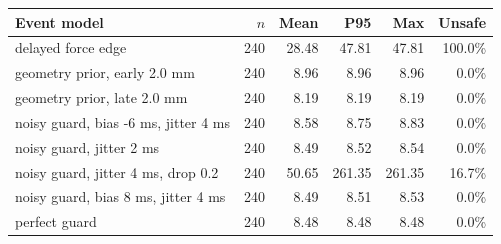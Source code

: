 \begin{tabular}{lrrrrr}\toprule
Event model & $n$ & Mean & P95 & Max & Unsafe\\
\midrule
delayed force edge & 240 & 28.48 & 47.81 & 47.81 & 100.0\%\\
geometry prior, early 2.0 mm & 240 & 8.96 & 8.96 & 8.96 & 0.0\%\\
geometry prior, late 2.0 mm & 240 & 8.19 & 8.19 & 8.19 & 0.0\%\\
noisy guard, bias -6 ms, jitter 4 ms & 240 & 8.58 & 8.75 & 8.83 & 0.0\%\\
noisy guard, jitter 2 ms & 240 & 8.49 & 8.52 & 8.54 & 0.0\%\\
noisy guard, jitter 4 ms, drop 0.2 & 240 & 50.65 & 261.35 & 261.35 & 16.7\%\\
noisy guard, bias 8 ms, jitter 4 ms & 240 & 8.49 & 8.51 & 8.53 & 0.0\%\\
perfect guard & 240 & 8.48 & 8.48 & 8.48 & 0.0\%\\
\bottomrule\end{tabular}

